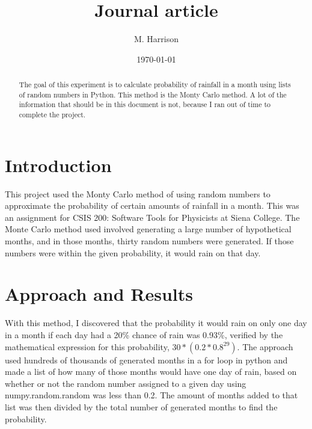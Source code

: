 \documentclass[twocolumn]{revtex4}
\begin{document}
\title{
Journal article
}

\author{M. Harrison}

\date{\today}

\begin{abstract}
	The goal of this experiment is to calculate probability of rainfall in a month using lists of random numbers in Python. This method is the Monty Carlo method.
A lot of the information that should be in this document is not, because I ran out of time to complete the project. 
	



\end{abstract}

\maketitle

\section{Introduction}
This project used the Monty Carlo method of using random numbers to approximate the probability of certain amounts of rainfall in a month. This was an assignment for CSIS 200: Software Tools for Physicists at Siena College. The Monte Carlo method used involved generating a large number of hypothetical months, and in those months, thirty random numbers were generated. If those numbers were within the given probability, it would rain on that day.


\section{Approach and Results}

 With this method, I discovered that the probability it would rain on only one day in a month if each day had a 20\% chance of rain was 0.93\%, verified by the mathematical expression for this probability, $30*(0.2*0.8^{29})$. The approach used hundreds of thousands of generated months in a for loop in python and made a list of how many of those months would have one day of rain, based on whether or not the random number assigned to a given day using numpy.random.random was less than 0.2. The amount of months added to that list was then divided by the total number of generated months to find the probability.
\end{document}
